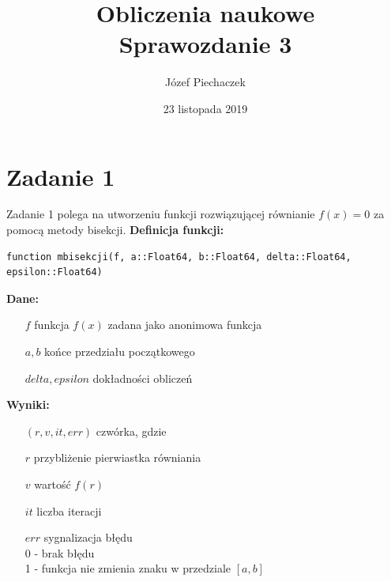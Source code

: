 \documentclass[12pt]{article}
\title{
	Obliczenia naukowe \\
	Sprawozdanie 3
}
\date{23 listopada 2019}
\author{Józef Piechaczek}
\begin{document}
\maketitle
\newpage
{}

\setlength{\abovedisplayskip}{5pt}
\setlength{\belowdisplayskip}{5pt}

\section{Zadanie 1}
Zadanie 1 polega na utworzeniu funkcji rozwiązującej równianie $f(x) = 0$ za pomocą metody bisekcji. \textbf{Definicja funkcji:}
\begin{verbatim}
function mbisekcji(f, a::Float64, b::Float64, delta::Float64, 
epsilon::Float64)
\end{verbatim}
\textbf{Dane:}
\begin{itemize}[leftmargin=4.0cm,labelsep=0.4cm]
\item[$f$] funkcja $f(x)$ zadana jako anonimowa funkcja
\item[$a, b$] końce przedziału początkowego
\item[$delta, epsilon$] dokładności obliczeń
\end{itemize}
\textbf{Wyniki:} 
\begin{itemize}[leftmargin=4.0cm,labelsep=0.4cm]
\item[$(r, v, it, err)$] czwórka, gdzie
\item[$r$] przybliżenie pierwiastka równiania 
\item[$v$] wartość $f(r)$
\item[$it$] liczba iteracji
\item[$err$] sygnalizacja błędu\\
0 - brak błędu\\
1 - funkcja nie zmienia znaku w przedziale $[a,b]$
\end{itemize}
\end{document}
